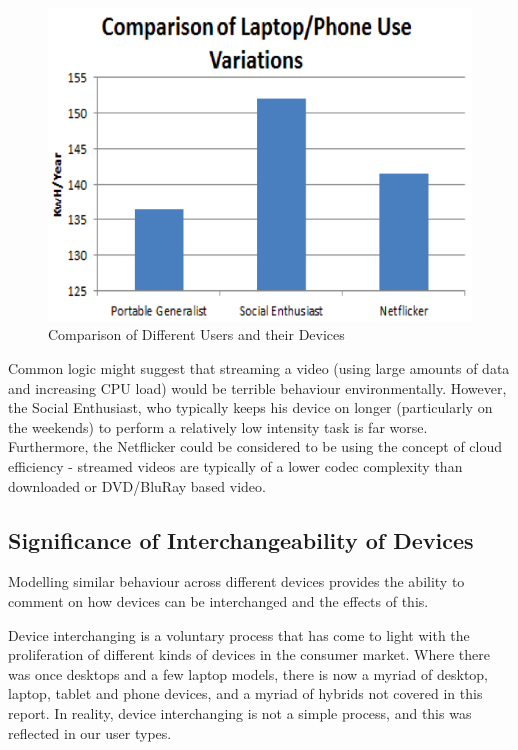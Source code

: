 \documentclass[conference]{IEEEtran}
\begin{document}
\begin{figure}[!ht]
\centering
\includegraphics[width=\columnwidth]{images/comparison_users_devices.png}
\caption{Comparison of Different Users and their Devices}
\label{fig:comparison_users_devices.png} 
\end{figure}

Common logic might suggest that streaming a video (using large amounts
of data and increasing CPU load) would be terrible behaviour
environmentally. However, the Social Enthusiast, who typically keeps
his device on longer (particularly on the weekends) to perform a
relatively low intensity task is far worse. Furthermore, the
Netflicker could be considered to be using the concept of cloud
efficiency - streamed videos are typically of a lower codec complexity
than downloaded or DVD/BluRay based video.

\subsection{Significance of Interchangeability of Devices}

Modelling similar behaviour across different devices provides the
ability to comment on how devices can be interchanged and the effects
of this.

Device interchanging is a voluntary process that has come to light
with the proliferation of different kinds of devices in the consumer
market. Where there was once desktops and a few laptop models, there
is now a myriad of desktop, laptop, tablet and phone devices, and a
myriad of hybrids not covered in this report. In reality, device
interchanging is not a simple process, and this was reflected in our
user types.
\end{document}
